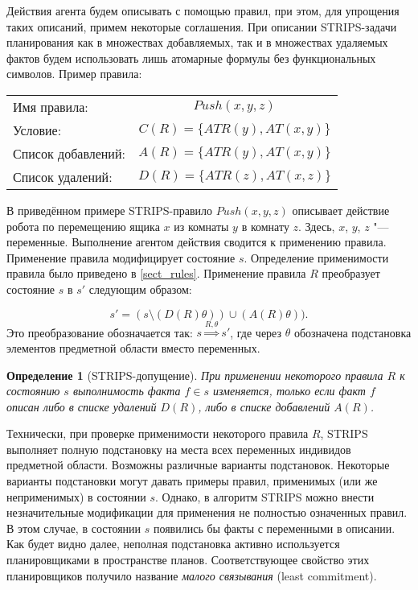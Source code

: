 \documentclass[b5paper,11pt]{book}
\newtheorem{Def}{Определение}
\begin{document}
	Действия агента будем описывать с помощью правил, при этом, для упрощения таких описаний, примем некоторые соглашения. При описании STRIPS-задачи планирования как в множествах добавляемых, так и в множествах удаляемых фактов будем использовать  лишь атомарные формулы без функциональных символов. Пример правила:
	
	\begin{table}[H]
		\centering
		\begin{tabular}{l c}
			Имя правила: & $Push(x, y, z)$\\
			Условие: & $C(R) = \{ATR (y), AT(x, y)\}$\\
			Список добавлений: & $A(R) = \{ATR (y), AT(x, y)\}$\\
			Список удалений: & $D(R) = \{ATR (z), AT(x, z)\}$
		\end{tabular}
	\end{table}
	
	В приведённом примере STRIPS-правило $Push(x, y, z)$ описывает действие робота по перемещению ящика $x$ из комнаты $y$ в комнату $z$. Здесь, $x$, $y$, $z$ "--- переменные. Выполнение агентом действия сводится к применению правила. Применение правила модифицирует состояние $s$.	Определение применимости правила было приведено в \autoref{sect_rules}. Применение правила $R$ преобразует состояние $s$ в $s'$ следующим образом:
	
	\[
		s' = (s \setminus (D(R)\theta)) \cup (A(R)\theta)).
	\]
	Это преобразование обозначается так: $s \overset{R,\theta}{\Rightarrow} s'$, где через $\theta$ обозначена подстановка элементов предметной области вместо переменных.
	
	\begin{Def}[STRIPS-допущение]
		При применении некоторого правила $R$ к состоянию $s$ выполнимость факта $f\in s$ изменяется, только если факт $f$ описан либо в списке удалений $D(R)$, либо в списке добавлений $A(R)$.
	\end{Def}
	
	Технически, при проверке применимости некоторого правила $R$, STRIPS выполняет полную подстановку на места всех переменных индивидов предметной области. Возможны различные варианты подстановок. Некоторые варианты подстановки могут давать примеры правил, применимых (или же неприменимых) в состоянии $s$. Однако, в алгоритм STRIPS можно внести незначительные модификации для применения не полностью означенных правил. В этом случае, в состоянии $s$ появились бы факты с переменными в описании. Как будет видно далее, неполная подстановка активно используется планировщиками в пространстве планов. Соответствующее свойство этих планировщиков получило название \textit{малого связывания} (least commitment).
	
\end{document}
